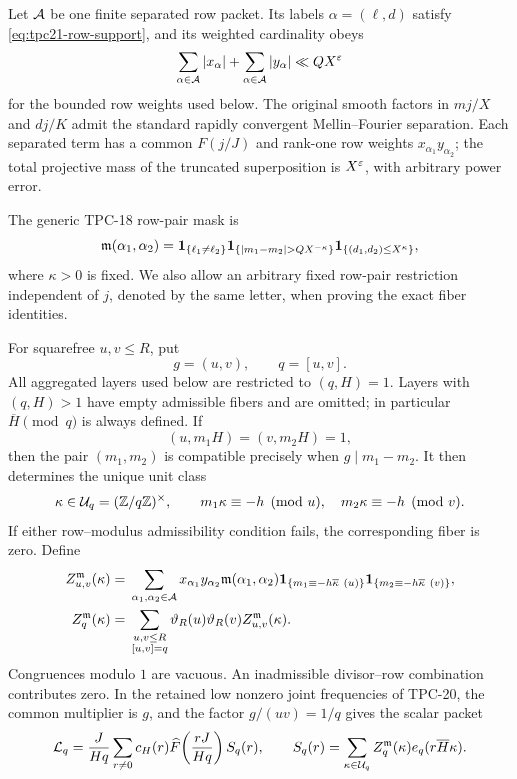 Let \(\mathcal A\) be one finite separated row packet.  Its labels
\(\alpha=(\ell,d)\) satisfy \eqref{eq:tpc21-row-support}, and its
weighted cardinality obeys
\begin{equation}
 \sum_{\alpha\in\mathcal A}|x_\alpha|
 +\sum_{\alpha\in\mathcal A}|y_\alpha|
 \ll QX^\varepsilon
 \label{eq:tpc21-row-mass}
\end{equation}
for the bounded row weights used below.  The original smooth factors in
\(mj/X\) and \(dj/K\) admit the standard rapidly convergent Mellin--Fourier
separation.  Each separated term has a common \(F(j/J)\) and rank-one
row weights \(x_{\alpha_1}y_{\alpha_2}\); the total projective mass of
the truncated superposition is \(X^\varepsilon\), with arbitrary power error.

The generic TPC-18 row-pair mask is
\begin{equation}
 \mathfrak m(\alpha_1,\alpha_2)
 =\one_{\{\ell_1\ne\ell_2\}}
  \one_{\{|m_1-m_2|>QX^{-\kappa}\}}
  \one_{\{(d_1,d_2)\le X^\kappa\}},
 \label{eq:tpc21-generic-mask}
\end{equation}
where \(\kappa>0\) is fixed.  We also allow an arbitrary fixed
row-pair restriction independent of \(j\), denoted by the same letter,
when proving the exact fiber identities.

For squarefree \(u,v\le R\), put
\begin{equation}
 g=(u,v),\qquad q=[u,v].
 \label{eq:tpc21-gq}
\end{equation}
All aggregated layers used below are restricted to \((q,H)=1\).
Layers with \((q,H)>1\) have empty admissible fibers and are omitted;
in particular \(\overline H\pmod q\) is always defined.
If
\[
 (u,m_1H)=(v,m_2H)=1,
\]
then the pair \((m_1,m_2)\) is compatible precisely when
\(g\mid m_1-m_2\).  It then determines the unique unit class
\begin{equation}
 \kappa\in\mathcal U_q=(\mathbb Z/q\mathbb Z)^\times,
 \qquad
 m_1\kappa\equiv-h\pmod u,
 \quad
 m_2\kappa\equiv-h\pmod v.
 \label{eq:tpc21-joint-kappa}
\end{equation}
If either row--modulus admissibility condition fails, the corresponding
fiber is zero.
Define
\begin{align}
 Z_{u,v}^{\mathfrak m}(\kappa)
 ={}&\sum_{\alpha_1,\alpha_2\in\mathcal A}
 x_{\alpha_1}y_{\alpha_2}
 \mathfrak m(\alpha_1,\alpha_2)
 \mathbf 1_{\{m_1\equiv-h\overline\kappa\ (u)\}}
 \mathbf 1_{\{m_2\equiv-h\overline\kappa\ (v)\}},
 \label{eq:tpc21-uv-fiber}\\
 Z_q^{\mathfrak m}(\kappa)
 ={}&\sum_{\substack{u,v\le R\\{}[u,v]=q}}
 \vartheta_R(u)\vartheta_R(v)
 Z_{u,v}^{\mathfrak m}(\kappa).
 \label{eq:tpc21-q-fiber}
\end{align}
Congruences modulo \(1\) are vacuous.  An inadmissible divisor--row
combination contributes zero.  In the retained low nonzero joint
frequencies of TPC-20, the common multiplier is \(g\), and the factor
\(g/(uv)=1/q\) gives the scalar packet
\begin{equation}
 \mathcal L_q
 =\frac{J}{Hq}\sum_{r\ne0}c_H(r)
 \widehat F\!\left(\frac{rJ}{Hq}\right)
 S_q(r),
 \qquad
 S_q(r)=\sum_{\kappa\in\mathcal U_q}
 Z_q^{\mathfrak m}(\kappa)e_q(r\overline H\kappa).
 \label{eq:tpc21-long-packet}
\end{equation}

